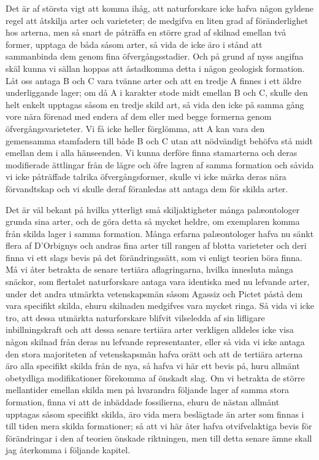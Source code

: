 Det är af största vigt att komma ihåg, att naturforskare icke hafva någon gyldene regel att åtskilja arter och varieteter; de medgifva en liten grad af föränderlighet hos arterna, men så snart de påträffa en större grad af skilnad emellan två former, upptaga de båda såsom arter, så vida de icke äro i stånd att sammanbinda dem genom fina öfvergångsstadier. Och på grund af nyss angifna skäl kunna vi sällan hoppas att åstadkomma detta i någon geologisk formation. Låt oss antaga B och C vara tvänne arter och att en tredje A finnes i ett äldre underliggande lager; om då A i karakter stode midt emellan B och C, skulle den helt enkelt upptagas såsom en tredje skild art, så vida den icke på samma gång vore nära förenad med endera af dem eller med begge formerna genom öfvergångsvarieteter. Vi få icke heller förglömma, att A kan vara den gemensamma stamfadern till både B och C utan att nödvändigt behöfva stå midt emellan dem i alla hänseenden. Vi kunna derföre finna stamarterna och deras modifierade ättlingar från de lägre och öfre lagren af samma formation och såvida vi icke påträffade talrika öfvergångsformer, skulle vi icke märka deras nära förvandtskap och vi skulle deraf föranledas att antaga dem för skilda arter.

Det är väl bekant på hvilka ytterligt små skiljaktigheter många palæontologer grunda sina arter, och de göra detta så mycket heldre, om exemplaren komma från skilda lager i samma formation. Många erfarna palæontologer hafva nu sänkt flera af D’Orbignys och andras fina arter till rangen af blotta varieteter och deri finna vi ett slags bevis på det förändringssätt, som vi enligt teorien böra finna. Må vi åter betrakta de senare tertiära aflagringarna, hvilka innesluta många snäckor, som flertalet naturforskare antaga vara identiska med nu lefvande arter, under det andra utmärkta vetenskapsmän såsom Agassiz och Pictet påstå dem vara specifikt skilda, ehuru skilnaden medgifves vara mycket ringa. Så vida vi icke tro, att dessa utmärkta naturforskare blifvit vilseledda af sin lifligare inbillningskraft och att dessa senare tertiära arter verkligen alldeles icke visa någon skilnad från deras nu lefvande representanter, eller så vida vi icke antaga den stora majoriteten af vetenskapsmän hafva orätt och att de tertiära arterna äro alla specifikt skilda från de nya, så hafva vi här ett bevis på, huru allmänt obetydliga modifikationer förekomma af önskadt slag. Om vi betrakta de större mellantider emellan skilda men på hvarandra följande lager af samma stora formation, finna vi att de inbäddade fossilierna, ehuru de nästan allmänt upptagas såsom specifikt skilda, äro vida mera beslägtade än arter som finnas i till tiden mera skilda formationer; så att vi här åter hafva otvifvelaktiga bevis för förändringar i den af teorien önskade riktningen, men till detta senare ämne skall jag återkomma i följande kapitel.

